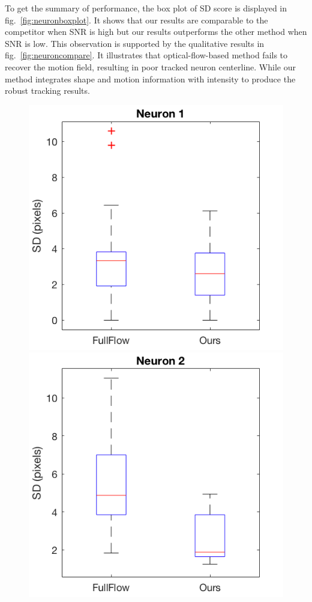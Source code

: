 \documentclass{article}
\begin{document}
To get the summary of performance, the box plot of SD score is displayed in fig.~\ref{fig:neuronboxplot}. It shows that our results are comparable to the competitor when SNR is high but our results outperforms the other method when SNR is low. This observation is supported by the qualitative results in fig.~\ref{fig:neuroncompare}. It illustrates that optical-flow-based method fails to recover the motion field, resulting in poor tracked neuron centerline. While our method integrates shape and motion information with intensity to produce the robust tracking results.
\begin{figure}[b!]
	\centering
	\begin{minipage}[b]{0.25\linewidth}
		\centerline{\includegraphics[width=\linewidth]{img/box_n1.png}}
	\end{minipage}
	\begin{minipage}[b]{0.25\linewidth}
		\centerline{\includegraphics[width=\linewidth]{img/box_n2.png}}

\end{minipage}
\end{figure}
\end{document}
